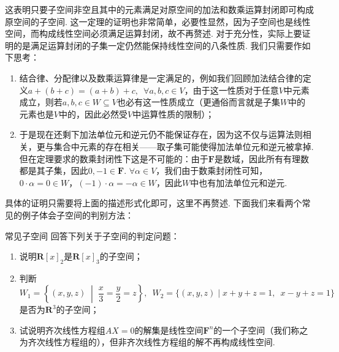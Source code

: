 这表明只要子空间非空且其中的元素满足对原空间的加法和数乘运算封闭即可构成原空间的子空间. 这一定理的证明也非常简单，必要性显然，因为子空间也是线性空间，而构成线性空间必须满足运算封闭，故不再赘述. 对于充分性，实际上要证明的是满足运算封闭的子集一定仍然能保持线性空间的八条性质. 我们只需要作如下思考：
\begin{enumerate}
    \item 结合律、分配律以及数乘运算律是一定满足的，例如我们回顾加法结合律的定义$a+(b+c)=(a+b)+c,\enspace\forall a,b,c\in V$，由于这一性质对于任意$V$中元素成立，则若$a,b,c\in W\subseteq V$也必有这一性质成立（更通俗而言就是子集$W$中的元素也是$V$中的，因此必然受$V$中运算性质的限制）；

    \item 于是现在还剩下加法单位元和逆元仍不能保证存在，因为这不仅与运算法则相关，更与集合中元素的存在相关——取子集可能使得加法单位元和逆元被拿掉. 但在定理要求的数乘封闭性下这是不可能的：由于$\mathbf{F}$是数域，因此所有有理数都是其子集，因此$0,-1\in\mathbf{F}$. $\forall \alpha\in V$，我们由于数乘封闭性可知，$0\cdot\alpha=0\in W$，$(-1)\cdot\alpha=-\alpha\in W$，因此$W$中也有加法单位元和逆元.
\end{enumerate}

具体的证明只需要将上面的描述形式化即可，这里不再赘述. 下面我们来看两个常见的例子体会子空间的判别方法：
\begin{example}{}{常见子空间}
    回答下列关于子空间的判定问题：
    \begin{enumerate}
        \item \label{item:2:常见子空间:1}
              说明$\mathbf{R}[x]_2$是$\mathbf{R}[x]_3$的子空间；

        \item \label{item:2:常见子空间:2}
              判断$W_1=\left\{(x,y,z) \;\middle|\; \dfrac{x}{3}=\dfrac{y}{2}=z\right\},\enspace W_2=\{(x,y,z) \mid x+y+z=1,\enspace x-y+z=1\}$是否为$\mathbf{R}^3$的子空间；

        \item \label{item:2:常见子空间:3}
              试说明齐次线性方程组$AX=0$的解集是线性空间$\mathbf{F}^n$的一个子空间（我们称之为齐次线性方程组的），但非齐次线性方程组的解不再构成线性空间.
    \end{enumerate}
\end{example}

